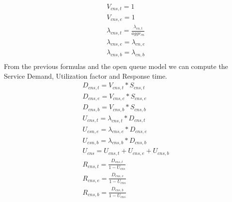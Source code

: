 \documentclass[11pt]{article}
\begin{document}
\begin{equation}
	\begin{array}{l}
		V_{cns, t} = 1 \\
		V_{cns, e} = 1 \\
		\lambda_{cns, t} = \frac{\lambda_{cn,t}}{aggr_{cn}} \\
		\lambda_{cns, e} = \lambda_{cn,e} \\
		\lambda_{cns, b} = \lambda_{cn,b} \\
	\end{array}
\end{equation}
From the previous formulas and the open queue model we can compute the Service Demand, Utilization factor and Response time.
\begin{equation}
	\begin{array}{l}
		D_{cns, t} = V_{cns, t} * S_{cns, t} \\
		D_{cns, e} = V_{cns, e} * S_{cns, e} \\
		D_{cns, b} = V_{cns, b} * S_{cns, b} \\
		U_{cns, t} = \lambda_{cns, t} * D_{cns, t} \\
		U_{csn, e} = \lambda_{cns, e} * D_{cns, e} \\
		U_{csn, b} = \lambda_{cns, b} * D_{cns, b} \\
        U_{cns} = U_{cns, t} + U_{cns, e} + U_{cns, b}\\
		R_{cns, t} = \frac{D_{cns, t}}{1 - U_{cns}} \\
		R_{cns, e} = \frac{D_{cns, e}}{1 - U_{cns}} \\
		R_{cns, b} = \frac{D_{cns, b}}{1 - U_{cns}} \\
	\end{array}
\end{equation}
\end{document}
